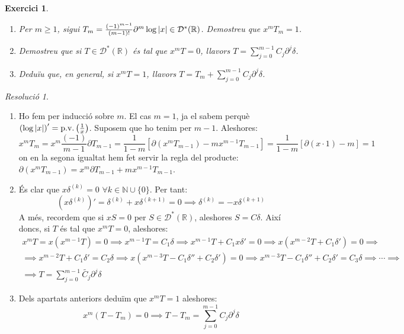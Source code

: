 \documentclass[10pt,a4paper]{article}
\newcommand{\NN}{\ensuremath{\mathbb{N}}} %
\newcommand{\RR}{\ensuremath{\mathbb{R}}} %
\newtheorem{exercici}{Exercici}
\theoremstyle{definition}
\theoremstyle{remark}
\newtheorem*{res}{Resolució}
\renewcommand{\pv}{\mathrm{p.v.}} %
\begin{document}
\begin{exercici}\hfill
  \begin{enumerate}
    \item Per $m\geq 1$, sigui $T_m=\frac{{(-1)}^{m-1}}{(m-1)!}\partial^m\log\abs{x}\in \mathcal{D}^*(\RR)$. Demostreu que $x^mT_m=1$.
    \item Demostreu que si $T\in\mathcal{D}^*(\RR)$ és tal que $x^mT=0$, llavors $T=\sum_{j= 0}^{m-1}C_j\partial^j\delta$.
    \item Deduïu que, en general, si $x^mT=1$, llavors $T=T_m+\sum_{j= 0}^{m-1}C_j\partial^j\delta $.
  \end{enumerate}
\end{exercici}
\begin{res}\hfill
  \begin{enumerate}
    \item Ho fem per inducció sobre $m$. El cas $m=1$, ja el sabem perquè ${(\log \abs{x})}'=\pv\left(\frac{1}{x}\right)$. Suposem que ho tenim per $m-1$. Aleshores:
          $$
            x^mT_m=x^m\frac{(-1)}{m-1}\partial T_{m-1}=\frac{1}{1-m} [\partial (x^m T_{m-1})-mx^{m-1}T_{m-1}]=\frac{1}{1-m} [\partial (x\cdot 1)-m]= 1
          $$
          on en la segona igualtat hem fet servir la regla del producte: $\partial(x^mT_{m-1})=x^m\partial T_{m-1}+mx^{m-1}T_{m-1}$.
    \item És clar que $x\delta^{(k)}=0$ $\forall k\in\NN\cup\{0\}$. Per tant:
          $$
            {(x\delta^{(k)})}'=\delta^{(k)}+x\delta^{(k+1)}=0\implies \delta^{(k)}=-x\delta^{(k+1)}
          $$
          A més, recordem que si $xS=0$ per $S\in\mathcal{D}^*(\RR)$, aleshores $S=C\delta$. Així doncs, si $T$ és tal que $x^mT=0$, aleshores:
          \begin{multline*}
            x^mT=x(x^{m-1}T)=0\implies x^{m-1}T=C_1\delta\implies x^{m-1}T+C_1x\delta'=0\implies x(x^{m-2} T+C_1\delta')=0\implies\\\implies x^{m-2} T+C_1\delta'=C_2\delta\implies x(x^{m-3} T -C_1\delta''+C_2\delta')=0\implies x^{m-3} T-C_1\delta''+C_2\delta'=C_3\delta\implies \cdots\implies\\\implies T = \sum_{j= 0}^{m-1}\tilde{C_j}\partial^j\delta
          \end{multline*}
    \item Dels apartats anteriors deduïm que $x^mT=1$ aleshores:
          $$
            x^m(T-T_m)=0\implies T-T_m=\sum_{j= 0}^{m-1}C_j\partial^j\delta
          $$
  \end{enumerate}
\end{res}
\end{document}
